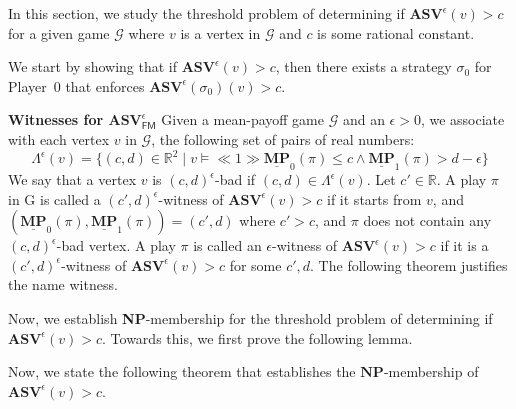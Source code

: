 In this section, we study the threshold problem of determining if $\mathbf{ASV}^{\epsilon}(v) > c$  for a given game $\mathcal{G}$ where $v$ is a vertex in $\mathcal{G}$ and $c$ is some rational constant.

We start by showing that if $\mathbf{ASV}^{\epsilon}(v) > c$, then there exists a strategy $\sigma_0$ for Player~0 that enforces $\mathbf{ASV}^{\epsilon}(\sigma_0)(v) > c$.



\noindent\textbf{Witnesses for $\mathbf{ASV}^{\epsilon}_{\mathsf{FM}}$} Given a mean-payoff game $\mathcal{G}$ and an $\epsilon > 0$, we associate with each vertex $v$ in $\mathcal{G}$, the following set of pairs of real numbers:
\begin{equation*}
\Lambda^{\epsilon}(v) = \{(c,d) \in \mathbb{R}^2 \mid v \models \ll 1 \gg \underline{\mathbf{MP}}_0(\pi) \leqslant c \land \underline{\mathbf{MP}}_1(\pi) > d-\epsilon \}
\end{equation*}
We say that a vertex $v$ is $(c,d)^{\epsilon}$-bad if $(c,d) \in \Lambda^{\epsilon}(v)$. Let $c' \in \mathbb{R}$. A play $\pi$ in G is called a $(c',d)^{\epsilon}$-witness of $\mathbf{ASV}^{\epsilon}(v) > c$ if it starts from $v$, and $(\underline{\mathbf{MP}}_0(\pi), \underline{\mathbf{MP}}_1(\pi)) = (c', d)$ where $c' > c$, and $\pi$ does not contain any $(c,d)^{\epsilon}$-bad vertex. A play $\pi$ is called an $\epsilon$-witness of $\mathbf{ASV}^{\epsilon}(v) > c$ if it is a $(c',d)^{\epsilon}$-witness of $\mathbf{ASV}^{\epsilon}(v) > c$ for some $c',d$. The following theorem justifies the name witness.



Now, we establish \textbf{NP}-membership for the threshold problem of determining if $\mathbf{ASV}^{\epsilon}(v) > c$. Towards this, we first prove the following lemma.



Now, we state the following theorem that establishes the $\mathbf{NP}$-membership of $\mathbf{ASV}^{\epsilon}(v) > c$.
